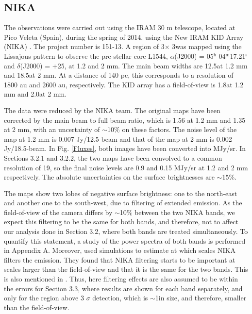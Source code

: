 \documentclass{aa}
\begin{document}
\subsection{NIKA}
The observations were carried out using the IRAM 30 m telescope, located at Pico Veleta (Spain), during the spring of 2014, using the New IRAM KID Array (NIKA) . The project number is 151-13. A region of 3\degr $\times$ 3\degr was mapped using the Lissajous pattern to observe the pre-stellar core L1544, $\alpha$(J2000) = 05$^{\mathrm{h}}$
04$^{\mathrm{m}}$17.21$^{\mathrm{s}}$ and $\delta$(J2000) = $+$25\arcsec \citep[dust peak from]{1999MNRAS.305..143W}, at 1.2 and 2 mm. The main beam widths are 12.5\arcsec at 1.2 mm and 18.5\arcsec at 2 mm. At a distance of 140 pc, this corresponds to a resolution of 1800 au and 2600 au, respectively. The KID array has a field-of-view is 1.8\arcmin at 1.2 mm and 2.0\arcmin at 2 mm. 

The data were reduced by the NIKA team. The original maps have been corrected by the main beam to full beam ratio, which is 1.56 at 1.2 mm and 1.35 at 2 mm, with an uncertainty of $\sim$10\% on these factors. The noise level of the map at 1.2 mm is 0.007 Jy/12.5\arcsec-beam and that of the map at 2 mm is 0.002 Jy/18.5\arcsec-beam. In Fig. \ref{Fluxes}, both images have been converted into MJy/sr. In Sections 3.2.1 and 3.2.2, the two maps have been convolved to a common resolution of 19\arcsec, so the final noise levels are 0.9 and 0.15 MJy/sr at 1.2 and 2 mm respectively. The absolute uncertainties on the surface brightnesses are $\sim$15\%. 

The maps show two lobes of negative surface brightness: one to the north-east and another one to the south-west, due to filtering of extended emission. As the field-of-view of the camera differs by $\sim$10\% between the two NIKA bands, we expect this filtering to be the same for both bands, and therefore, not to affect our analysis done in Section 3.2, where both bands are treated simultaneously. To quantify this statement, a study of the power spectra of both bands is performed in Appendix A. Moreover,  used simulations to estimate at which scales NIKA filters the emission. They found that NIKA filtering starts to be important at scales larger than the field-of-view and that it is the same for the two bands. This is also mentioned in . Thus, here filtering effects are also assumed to be within the errors for Section 3.3, where results are shown for each band separately, and only for the region above 3 $\sigma$ detection, which is $\sim$1\arcmin  in size, and therefore, smaller than the field-of-view.  
\end{document}
